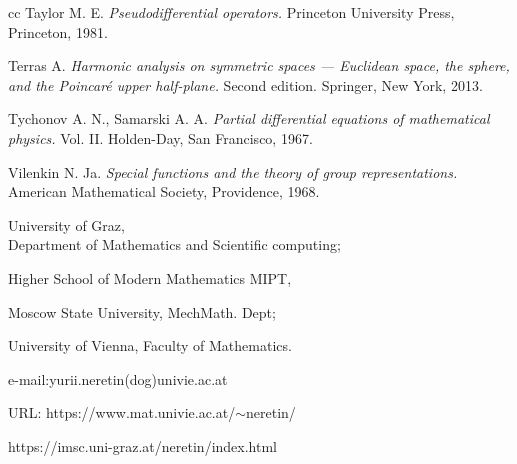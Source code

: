 \documentclass[]{amsart}
\def\sm{\smallskip}
\begin{document}
\begin{thebibliography}{cc}
Taylor M. E.
{\it Pseudodifferential operators.}
Princeton University Press, Princeton,  1981.


Terras A.
{\it Harmonic analysis on symmetric spaces --- Euclidean space, the sphere, and the Poincar\'e upper half-plane.}
Second edition.
Springer, New York, 2013.


Tychonov A. N., Samarski A. A.
{\it Partial differential equations of mathematical physics.} Vol. II.
Holden-Day, San Francisco,  1967.

Vilenkin N. Ja.
{\it Special functions and the theory of group representations.}
American Mathematical Society, Providence,  1968.

\end{thebibliography}

\tt

University of Graz,
\\
\phantom{.}
\hfill Department of Mathematics and Scientific computing;

Higher School of Modern Mathematics MIPT,


Moscow State University, MechMath. Dept;

 University of Vienna, Faculty of Mathematics.
 
 \sm

e-mail:yurii.neretin(dog)univie.ac.at

URL: https://www.mat.univie.ac.at/$\sim$neretin/ 

\phantom{URL:} https://imsc.uni-graz.at/neretin/index.html
\end{document}
